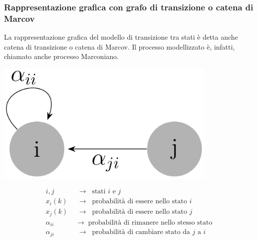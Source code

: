 \subsubsection*{Rappresentazione grafica con grafo di transizione o catena di Marcov}
La rappresentazione grafica del modello di transizione tra stati è detta anche catena di transizione o catena di Marcov. Il processo
modellizzato è, infatti, chiamato anche processo Marconiano.
\begin{center}
	\begin{minipage}{0.25\textwidth}
		\centering
		\includegraphics[width=0.8\textwidth]{modelli/modello transizione.png}
	\end{minipage}
	\begin{minipage}{0.65\textwidth}
		\begin{align*}
			i,j \;\; &\rightarrow \;\; \text{stati } i \text{ e } j \\
			x_i(k) \;\; &\rightarrow \;\; \text{probabilità di essere nello stato } i \\
			x_j(k) \;\; &\rightarrow \;\; \text{probabilità di essere nello stato } j \\
			\alpha_{ii} \;\; &\rightarrow \;\; \text{probabilità di rimanere nello stesso stato} \\
			\alpha_{ji} \;\; &\rightarrow \;\; \text{probabilità di cambiare stato da } j \text{ a } i \\ 
		\end{align*}
	\end{minipage}
\end{center}

